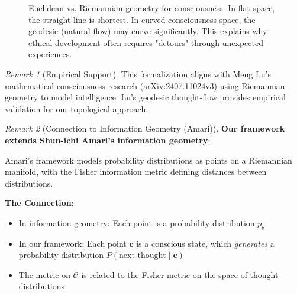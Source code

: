 \documentclass[11pt,a4paper]{article}
\theoremstyle{definition}
\theoremstyle{remark}
\newtheorem{remark}{Remark}[section]
\newcommand{\CC}{\mathcal{C}}
\newcommand{\cc}{\mathbf{c}}
\begin{document}
\begin{small}
\begin{figure}[H]
\caption{Euclidean vs. Riemannian geometry for consciousness. In flat space, the straight line is shortest. In curved consciousness space, the geodesic (natural flow) may curve significantly. This explains why ethical development often requires "detours" through unexpected experiences.}
\label{fig:euclidean_vs_riemannian}
\end{figure}

\begin{remark}[Empirical Support]
This formalization aligns with Meng Lu's mathematical consciousness research (arXiv:2407.11024v3) using Riemannian geometry to model intelligence. Lu's geodesic thought-flow provides empirical validation for our topological approach.
\end{remark}

\begin{remark}[Connection to Information Geometry (Amari)]
\textbf{Our framework extends Shun-ichi Amari's information geometry}:

Amari's framework models probability distributions as points on a Riemannian manifold, with the Fisher information metric defining distances between distributions. 

\textbf{The Connection}:
\begin{itemize}
    \item In information geometry: Each point is a probability distribution \(p_\theta\)
    \item In our framework: Each point \(\cc\) is a conscious state, which \textit{generates} a probability distribution \(P(\text{next thought} \mid \cc)\)
    \item The metric on \(\CC\) is related to the Fisher metric on the space of thought-distributions
\end{itemize}


\end{remark}
\end{small}
\end{document}
